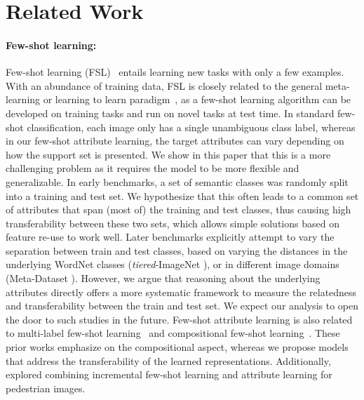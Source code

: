 \savespacebeforesection
\section{Related Work}
\savespacebeforesection
\paragraph{Few-shot learning:}
Few-shot learning (FSL)~\citep{fei2006one,lake2011oneshot,matchingnet} entails
learning new tasks with only a few examples. With an abundance of training
data, FSL is closely related to the general meta-learning or learning to learn
paradigm~\citep {Thrun1998}, as a few-shot learning algorithm can be developed
on training tasks and run on novel tasks at test time. In standard few-shot
classification, each image only has a single unambiguous class label, whereas
in our few-shot attribute learning, the target attributes can vary depending on
how the support set is presented. We show in this paper that this is a more
challenging problem as it requires the model to be more flexible and
generalizable. In early benchmarks, a set of semantic classes was randomly
split into a training and test set. We hypothesize that this often leads to a
common set of attributes that span (most of) the training and test classes,
thus causing high transferability between these two sets, which allows simple
solutions based on feature re-use \citep{closerlook,anil} to work well. Later
benchmarks explicitly attempt to vary the separation between train and test
classes, based on varying the distances in the underlying WordNet classes
(\textit{tiered}-ImageNet \citep{fewshotssl}), or in different image domains
(Meta-Dataset \citep{triantafillou2019meta}). However, we argue that reasoning
about the underlying attributes directly offers a more systematic framework to
measure the relatedness and transferability between the train and test set. We
expect our analysis to open the door to such studies in the future. Few-shot
attribute learning is also related to multi-label few-shot
learning~\citep{alfassy2019laso,li2021compositional} and compositional few-shot learning~\citep{tokmakov2019learning}. These prior works
emphasize on the compositional aspect, whereas we propose models that address
the transferability of the learned representations.
Additionally,
\citet{xiang2019incremental} explored combining incremental few-shot learning
and attribute learning for pedestrian images.

\savespacebeforesection
